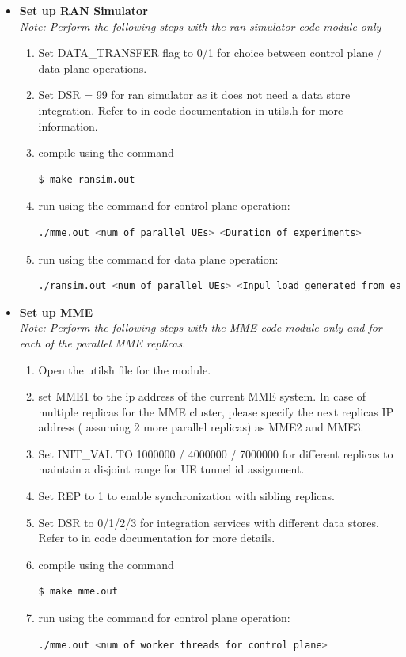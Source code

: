 \pdfminorversion=4\documentclass[hidelinks]{report}
\begin{document}
\begin{enumerate}
\begin{itemize}
\item \textbf{Set up RAN Simulator}\\
\textit{Note: Perform the following steps with the ran simulator code module only}
\begin{enumerate}
\item Set DATA\_TRANSFER flag to 0/1 for choice between control plane / data plane operations.
\item Set DSR = 99 for ran simulator as it does not need a data store integration. Refer to in code documentation  in utils.h for more information.
\item compile using the command 
\begin{lstlisting}[language=bash]
$ make ransim.out
\end{lstlisting}
\item run using the command for control plane operation:
\begin{lstlisting}[language=bash]
./mme.out <num of parallel UEs> <Duration of experiments>
\end{lstlisting}
\item run using the command for data plane operation:
\begin{lstlisting}[language=bash]
./ransim.out <num of parallel UEs> <Inpul load generated from each UE>
\end{lstlisting}
\end{enumerate}

\item \textbf{Set up MME}\\

\textit{Note: Perform the following steps with the MME code module only and for each of the parallel MME replicas.}
\begin{enumerate}

\item Open the utils\.h file for the module.
\item set MME1 to the ip address of the current MME system. In case of multiple replicas for the MME cluster, please specify the next replicas IP address ( assuming 2 more parallel replicas) as MME2 and MME3.
\item Set INIT\_VAL TO 1000000 / 4000000 / 7000000 for different replicas to maintain a disjoint range for UE tunnel id assignment.
\item Set REP to 1 to enable synchronization with sibling replicas.
\item Set DSR to 0/1/2/3 for integration services with different data stores. Refer to in code documentation for more details.
\item compile using the command 
\begin{lstlisting}[language=bash]
$ make mme.out
\end{lstlisting}
\item run using the command for control plane operation:
\begin{lstlisting}[language=bash]
./mme.out <num of worker threads for control plane>
\end{lstlisting}


\end{enumerate}
\end{itemize}
\end{enumerate}
\end{document}
